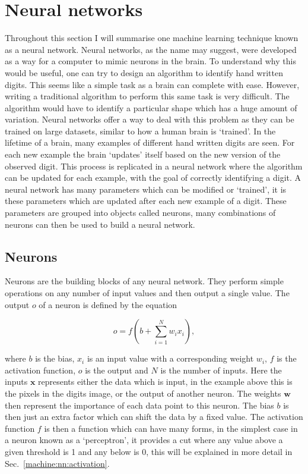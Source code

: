\section{\label{machine:nn}Neural networks}

Throughout this section I will summarise one machine learning technique known as a neural network. 
Neural networks, as the name may suggest, were developed as a way for a computer to mimic neurons in the brain.
To understand why this would be useful, one can try to design an algorithm to identify hand written digits.
This seems like a simple task as a brain can complete with ease. 
However, writing a traditional algorithm to perform this same task is very difficult. 
The algorithm would have to identify a particular shape which has a huge amount of variation.
Neural networks offer a way to deal with this problem as they can be trained on large datasets, similar to how a human brain is `trained'. 
In the lifetime of a brain, many examples of different hand written digits are seen. 
For each new example the brain `updates' itself based on the new version of the observed digit. 
This process is replicated in a neural network where the algorithm can be updated for each example, with the goal of correctly identifying a digit.
A neural network has many parameters which can be modified or `trained', it is these parameters which are updated after each new example of a digit. 
These parameters are grouped into objects called neurons, many combinations of neurons can then be used to build a neural network.

\subsection{\label{machine:nn:neuron}Neurons}

Neurons are the building blocks of any neural network.
They perform simple operations on any number of input values and then output a single value.
The output $o$ of a neuron is defined by the equation

\begin{equation}
    o = f\left(b + \sum_{i=1}^{N} w_i x_i  \right),
    \label{machine:nn:neuron:equation}
\end{equation}

where $b$ is the bias, $x_i$ is an input value with a corresponding weight $w_i$, $f$ is the activation function, $o$ is the output and $N$ is the number of inputs.
Here the inputs $\mathbf{x}$ represents either the data which is input, in the example above this is the pixels in the digits image, or the output of another neuron.
The weights $\mathbf{w}$ then represent the importance of each data point to this neuron. 
The bias $b$ is then just an extra factor which can shift the data by a fixed value.
The activation function $f$ is then a function which can have many forms, in the simplest case in a neuron known as a `perceptron', it provides a cut where any value above a given threshold is 1 and any below is 0, this will be explained in more detail in Sec.~\ref{machine:nn:activation}. 

